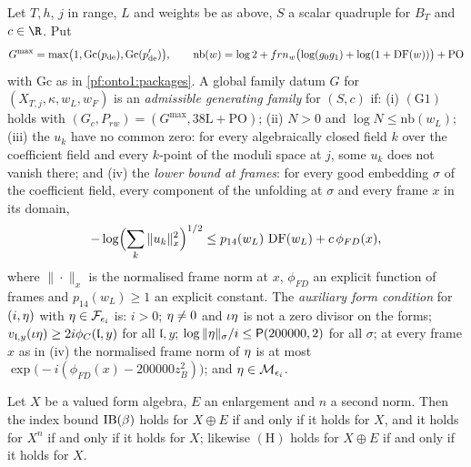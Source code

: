 \begin{definition}\label{pf:onto1:genok-def}
Let $T,h$, $j$ in range, $L$ and weights be as above, $S$ a scalar quadruple for $B_T$ and $c\in\R$. Put
\[
G^{\max}=\max\bigl(1,\mathrm{Gc}(p_{\mathrm{de}}),\mathrm{Gc}(p'_{\mathrm{de}})\bigr),\qquad
\mathrm{nb}(w)=\log2+frn_w\bigl(\log(g_0g_1)+\log(1+\operatorname{DF}(w))\bigr)+\mathrm{PO}
\]
with $\mathrm{Gc}$ as in \cref{pf:onto1:packages}. A global family datum $G$ for $(X_{T,j},\kappa,w_L,w_F)$ is an
\emph{admissible generating family} for $(S,c)$ if: (i) $(\mathrm G1)$ holds with $(G_c,P_{rw})=(G^{\max},38\mathrm
L+\mathrm{PO})$; (ii) $N>0$ and $\log N\le\mathrm{nb}(w_L)$; (iii) the $u_k$ have no common zero: for every algebraically
closed field $k$ over the coefficient field and every $k$-point of the moduli space at $j$, some $u_k$ does not vanish
there; and (iv) the \emph{lower bound at frames}: for every good embedding $\sigma$ of the coefficient field, every
component of the unfolding at $\sigma$ and every frame $x$ in its domain,
\[
-\log\Bigl(\sum_{k}\|u_k\|_{x}^2\Bigr)^{1/2}\le p_{14}(w_L)\,\operatorname{DF}(w_L)+c\,\phi_{FD}(x),
\]
where $\|\cdot\|_x$ is the normalised frame norm at $x$, $\phi_{FD}$ an explicit function of frames and $p_{14}(w_L)\ge1$ an
explicit constant. The \emph{auxiliary form condition} for $(i,\eta)$ with $\eta\in\mathcal F_{\epsilon_i}$ is: $i>0$;
$\eta\ne0$ and $\iota\eta$ is not a zero divisor on the forms; $v_{\mathfrak l,y}(\iota\eta)\ge2i\phi_C(\mathfrak l,y)$
for all $\mathfrak l,y$; $\log\|\eta\|_\sigma/i\le\mathsf{P}(200000,2)$ for all $\sigma$; at every frame $x$ as in (iv)
the normalised frame norm of $\eta$ is at most $\exp\bigl(-i(\phi_{FD}(x)-200000z_B^2)\bigr)$; and $\eta\in\mathcal
M_{\epsilon_i}$.
\end{definition}

\begin{lemma}\label{pf:onto1:transport}
Let $X$ be a valued form algebra, $E$ an enlargement and $n$ a second norm. Then the index bound $\mathrm{IB}(\beta)$
holds for $X\oplus E$ if and only if it holds for $X$, and it holds for $X^n$ if and only if it holds for $X$; likewise
$(\mathrm H)$ holds for $X\oplus E$ if and only if it holds for $X$.
\end{lemma}

